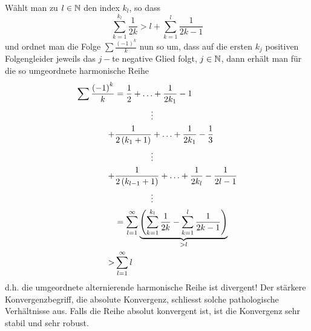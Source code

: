 \noindent Wählt man zu $l\in\mathbb{N}$ den index $k_l$, so dass
\[\sum\limits_{k = 1}^{{k_l}} {\frac{1}{{2k}}}  > l + \sum\limits_{k = 1}^l {\frac{1}{{2k - 1}}} \]
und ordnet man die Folge $\sum\frac{\left( -1\right)^k}{k}$ nun so um, dass auf die ersten $k_j$ positiven Folgengleider jeweils das $j-$te negative Glied folgt, $j\in\mathbb{N}$, dann erhält man für die so umgeordnete harmonische Reihe
\begin{align*}
\sum {\frac{{{{\left( { - 1} \right)}^k}}}{k}}  &= \frac{1}{2} +  \ldots  + \frac{1}{{2{k_1}}} - 1\\
 &\hspace{15mm}\vdots \\
 +& \frac{1}{{2\left( {{k_1} + 1} \right)}} +  \ldots  + \frac{1}{{2{k_1}}} - \frac{1}{3}\\
&\hspace{15mm} \vdots \\
 +& \frac{1}{{2\left( {{k_{l - 1}} + 1} \right)}} +  \ldots  + \frac{1}{{2{k_l}}} - \frac{1}{{2l - 1}}\\
 &\hspace{15mm}\vdots \\
 &= \sum\limits_{l = 1}^\infty  {\underbrace {\left( {\sum\limits_{k = 1}^{{k_l}} {\frac{1}{{2k}}}  - \sum\limits_{k = 1}^l {\frac{1}{{2k - 1}}} } \right)}_{ > l}} \\
 >& \sum\limits_{l = 1}^\infty  l
\end{align*}
d.h. die umgeordnete alternierende harmonische Reihe ist divergent! Der stärkere Konvergenzbegriff, die absolute Konvergenz, schliesst solche pathologische\\ Verhältnisse aus. Falls die Reihe absolut konvergent ist, ist die Konvergenz sehr stabil und sehr robust.
